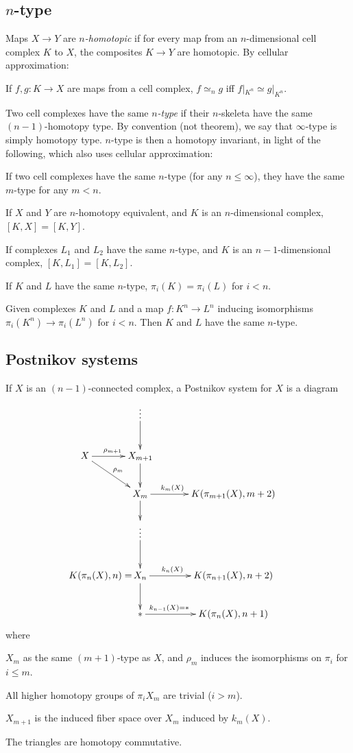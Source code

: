 \documentclass[11pt]{article}
\begin{document}
\subsection{\texorpdfstring{$n$}{n}-type}
Maps $X\to Y$ are \emph{$n$-homotopic} if for every map from an $n$-dimensional
cell complex $K$ to $X$, the composites $K\to Y$ are homotopic. By cellular
approximation:
\begin{prop*}
If $f,g:K\to X$ are maps from a cell complex, $f \simeq_n g$ iff 
$f|_{K^n}\simeq g|_{K^n}$.
\end{prop*}
Two cell complexes have the same \emph{$n$-type} if their $n$-skeleta have the
same $(n-1)$-homotopy type. By convention (not theorem), we say that
$\infty$-type is simply homotopy type. $n$-type is then a homotopy invariant, in
light of the following, which also uses cellular approximation:
\begin{prop*}
If two cell complexes have the same $n$-type (for any $n\leq\infty$), they have
the same $m$-type for any $m<n$.
\end{prop*}
\begin{lem*}
If $X$ and $Y$ are $n$-homotopy equivalent, and $K$ is an $n$-dimensional
complex, $[K,X]=[K,Y]$.
\end{lem*}
\begin{thm*}
If complexes $L_1$ and $L_2$ have the same $n$-type, and $K$ is an
$n-1$-dimensional complex, $[K,L_1]=[K,L_2]$.
\end{thm*}
\begin{cor*}
If $K$ and $L$ have the same $n$-type, $\pi_i(K)=\pi_i(L)$ for $i<n$.
\end{cor*}
\begin{thm*}[Whitehead]
Given complexes $K$ and $L$ and a map $f:K^n\to L^n$ inducing isomorphisms
$\pi_i(K^n)\to\pi_i(L^n)$ for $i<n$. Then $K$ and $L$ have the same $n$-type.
\end{thm*}

\subsection{Postnikov systems}
If $X$ is an $(n-1)$-connected complex, a Postnikov system for $X$ is a diagram
\[\xymatrix@C=1.2cm{
&\vdots\ar[d]\\
X\ar[r]^{\rho_{m+1}}\ar[rd]^{\rho_m}&X_{m+1}\ar[d]\\
&X_m\ar[r]^{k_m(X)\ \ \ \ \ \ \ \ \ }\ar[d]&K(\pi_{m+1}(X),m+2)\\
&\vdots\ar[d]\\
&\makebox[0cm][r]{$K(\pi_n(X),n)=\,$}
X_n\ar[r]^{k_n(X)\ \ \ \ \ \ \ \ \ }\ar[d]&K(\pi_{n+1}(X),n+2)\\
&{*}\ar[r]^{k_{n-1}(X)=*\ \ \ \ \ \ \ \ \ \ \ }&K(\pi_{n}(X),n+1)
}\]
where
\begin{itemise}
\item $X_m$ as the same $(m+1)$-type as $X$, and $\rho_m$ induces the
isomorphisms on $\pi_i$ for $i\leq m$.
\item All higher homotopy groups of $\pi_iX_m$ are trivial ($i>m$).
\item $X_{m+1}$ is the induced fiber space over $X_m$ induced by $k_m(X)$.
\item The triangles are homotopy commutative.
\end{itemise}
\end{document}
